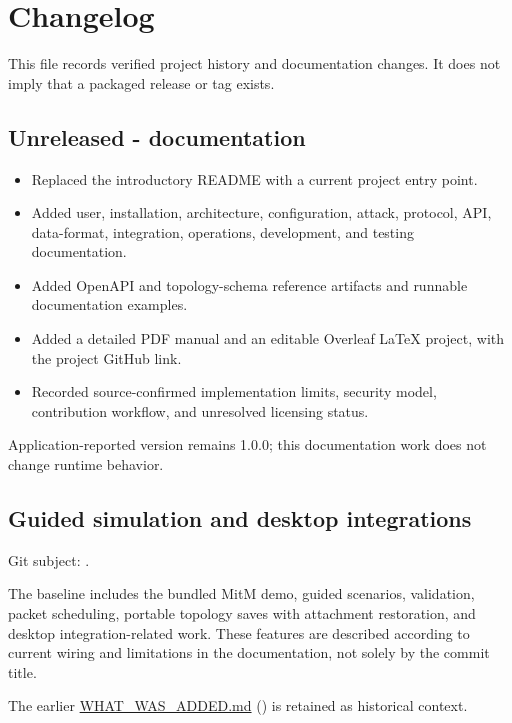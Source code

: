 \chapter{Changelog}\label{chapter-18}
This file records verified project history and documentation changes. It does not imply that a packaged release or tag exists.

\section*{Unreleased  -  documentation}
\begin{itemize}
\item Replaced the introductory README with a current project entry point.
\item Added user, installation, architecture, configuration, attack, protocol, API, data-format, integration, operations, development, and testing documentation.
\item Added OpenAPI and topology-schema reference artifacts and runnable documentation examples.
\item Added a detailed PDF manual and an editable Overleaf LaTeX project, with the project GitHub link.
\item Recorded source-confirmed implementation limits, security model, contribution workflow, and unresolved licensing status.
\end{itemize}

Application-reported version remains 1.0.0; this documentation work does not change runtime behavior.

\section*{Guided simulation and desktop integrations}
Git subject: .

The baseline includes the bundled MitM demo, guided scenarios, validation, packet scheduling, portable topology saves with attachment restoration, and desktop integration-related work. These features are described according to current wiring and limitations in the documentation, not solely by the commit title.

The earlier \href{https://github.com/neerajjayesh/GridSec-project/blob/main/WHAT_WAS_ADDED.md}{WHAT\_WAS\_ADDED.md} () is retained as historical context.

